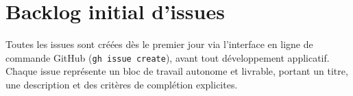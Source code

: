 \documentclass[12pt, a4paper]{article}
\begin{document}
\section{Backlog initial d'issues}

Toutes les issues sont créées dès le premier jour via l'interface
en ligne de commande GitHub (\texttt{gh issue create}), avant
tout développement applicatif. Chaque issue représente un bloc
de travail autonome et livrable, portant un titre, une
description et des critères de complétion explicites.

\end{document}
